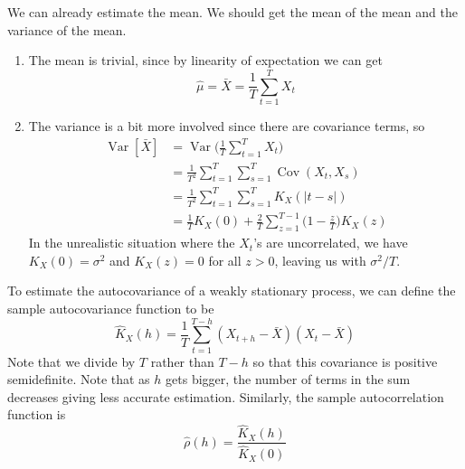 \documentclass{article}
\DeclareMathOperator{\Cov}{Cov}
\DeclareMathOperator{\Var}{Var}
\begin{document}
    \begin{theorem}
      We can already estimate the mean. We should get the mean of the mean and the variance of the mean. 
      \begin{enumerate}
        \item The mean is trivial, since by linearity of expectation we can get 
          \begin{equation}
            \hat{\mu} = \bar{X} = \frac{1}{T} \sum_{t=1}^T X_t
          \end{equation}

        \item The variance is a bit more involved since there are covariance terms, so 
          \begin{align}
            \Var[\bar{X}] & = \Var \bigg( \frac{1}{T} \sum_{t=1}^T X_t \bigg) \\
                          & = \frac{1}{T^2} \sum_{t=1}^T \sum_{s=1}^T \Cov(X_t, X_s) \\
                          & = \frac{1}{T^2} \sum_{t=1}^T \sum_{s=1}^T K_X (|t - s|) \\
                          & = \frac{1}{T} K_X (0) + \frac{2}{T} \sum_{z=1}^{T-1} \Big(1 - \frac{z}{T} \Big) K_X (z)
          \end{align} 
          In the unrealistic situation where the $X_t$'s are uncorrelated, we have $K_X (0) = \sigma^2$ and $K_X (z) = 0$ for all $z > 0$, leaving us with $\sigma^2 / T$. 
      \end{enumerate}
    \end{theorem}

    \begin{theorem}
      To estimate the autocovariance of a weakly stationary process, we can define the sample autocovariance function to be
      \begin{equation}
        \hat{K}_X (h) = \frac{1}{T} \sum_{t=1}^{T-h} (X_{t+h} - \bar{X}) (X_t - \bar{X})
      \end{equation}
      Note that we divide by $T$ rather than $T - h$ so that this covariance is positive semidefinite. Note that as $h$ gets bigger, the number of terms in the sum decreases giving less accurate estimation. Similarly, the sample autocorrelation function is 
      \begin{equation}
        \hat{\rho} (h) = \frac{\hat{K}_X (h)}{\hat{K}_X (0)}
      \end{equation}
    \end{theorem}
\end{document}
